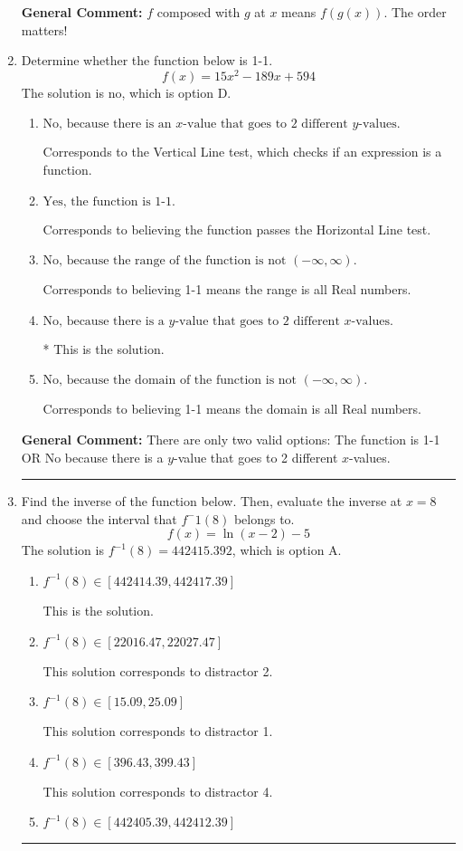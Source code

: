 \documentclass{extbook}[14pt]
\newcommand{\litem}[1]{\item #1

\rule{\textwidth}{0.4pt}}
\begin{document}
\begin{enumerate}
{\textbf{General Comment:} $f$ composed with $g$ at $x$ means $f(g(x))$. The order matters!
}
\litem{
Determine whether the function below is 1-1.
\[ f(x) = 15 x^2 - 189 x + 594 \]The solution is \( \text{no} \), which is option D.\begin{enumerate}[label=\Alph*.]
\item \( \text{No, because there is an $x$-value that goes to 2 different $y$-values.} \)

Corresponds to the Vertical Line test, which checks if an expression is a function.
\item \( \text{Yes, the function is 1-1.} \)

Corresponds to believing the function passes the Horizontal Line test.
\item \( \text{No, because the range of the function is not $(-\infty, \infty)$.} \)

Corresponds to believing 1-1 means the range is all Real numbers.
\item \( \text{No, because there is a $y$-value that goes to 2 different $x$-values.} \)

* This is the solution.
\item \( \text{No, because the domain of the function is not $(-\infty, \infty)$.} \)

Corresponds to believing 1-1 means the domain is all Real numbers.
\end{enumerate}

\textbf{General Comment:} There are only two valid options: The function is 1-1 OR No because there is a $y$-value that goes to 2 different $x$-values.
}
\litem{
Find the inverse of the function below. Then, evaluate the inverse at $x = 8$ and choose the interval that $f^-1(8)$ belongs to.
\[ f(x) = \ln{(x-2)}-5 \]The solution is \( f^{-1}(8) = 442415.392 \), which is option A.\begin{enumerate}[label=\Alph*.]
\item \( f^{-1}(8) \in [442414.39, 442417.39] \)

 This is the solution.
\item \( f^{-1}(8) \in [22016.47, 22027.47] \)

 This solution corresponds to distractor 2.
\item \( f^{-1}(8) \in [15.09, 25.09] \)

 This solution corresponds to distractor 1.
\item \( f^{-1}(8) \in [396.43, 399.43] \)

 This solution corresponds to distractor 4.
\item \( f^{-1}(8) \in [442405.39, 442412.39] \)


\end{enumerate}}
\end{enumerate}
\end{document}
